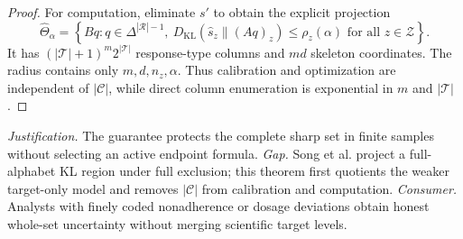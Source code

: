 \documentclass{article}
\begin{document}
\begin{proof}
For computation, eliminate \(s'\) to obtain the explicit projection
\[
\widehat\Theta_\alpha
=\left\{Bq:q\in\Delta^{|\mathcal R|-1},\ 
D_{\mathrm{KL}}(\widehat s_z\|(Aq)_z)\le\rho_z(\alpha)
\text{ for all }z\in\mathcal Z\right\}.
\]
It has \((|\mathcal T|+1)^m2^{|\mathcal T|}\) response-type columns and \(md\) skeleton coordinates.  The radius contains only \(m,d,n_z,\alpha\).  Thus calibration and optimization are independent of \(|\mathcal C|\), while direct column enumeration is exponential in \(m\) and \(|\mathcal T|\).
\end{proof}
\par\smallskip\noindent \textit{Justification.} The guarantee protects the complete sharp set in finite samples without selecting an active endpoint formula. \textit{Gap.} Song et al. project a full-alphabet KL region under full exclusion; this theorem first quotients the weaker target-only model and removes \(|\mathcal C|\) from calibration and computation. \textit{Consumer.} Analysts with finely coded nonadherence or dosage deviations obtain honest whole-set uncertainty without merging scientific target levels.
\end{document}
